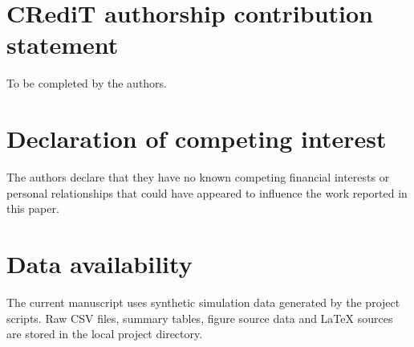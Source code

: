 \documentclass[final,5p,twocolumn,number,nopreprintline]{elsarticle}
\begin{document}
\section*{CRediT authorship contribution statement}
To be completed by the authors.

\section*{Declaration of competing interest}
The authors declare that they have no known competing financial interests or personal relationships that could have appeared to influence the work reported in this paper.

\section*{Data availability}
The current manuscript uses synthetic simulation data generated by the project scripts. Raw CSV files, summary tables, figure source data and LaTeX sources are stored in the local project directory.


\end{document}
